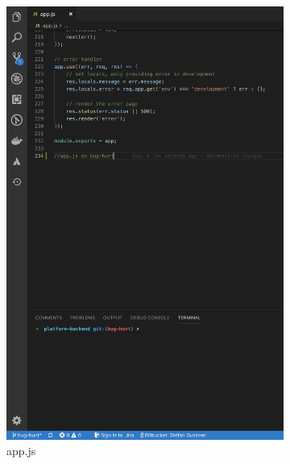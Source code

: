 \begin{figure}[h]
    \begin{subfigure}{.5\textwidth}
        \centering
        \includegraphics[width=1\linewidth]{figures/screenshots/scenarios/1appjs_on_bughunt.png}
        \caption{app.js}
        \label{fig:1appjs_on_bughunt}
        \end{subfigure}
    \begin{subfigure}{.5\textwidth}
        \centering

\end{subfigure}
\end{figure}
